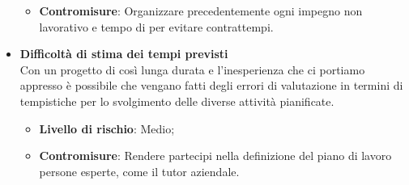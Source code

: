 \begin{itemize}
\begin{itemize}
	      	\item \textbf{Contromisure}: Organizzare precedentemente ogni impegno non lavorativo e tempo di  per evitare contrattempi.
	      \end{itemize}
	\item \textbf{Difficoltà di stima dei tempi previsti}\\
	      Con un progetto di così lunga durata e l'inesperienza che ci portiamo appresso è possibile che vengano fatti degli errori di valutazione in termini di tempistiche per lo svolgimento delle diverse attività pianificate.
	      \begin{itemize}
	      	\item \textbf{Livello di rischio}: Medio;
	      	\item \textbf{Contromisure}: Rendere partecipi nella definizione del piano di lavoro persone esperte, come il tutor aziendale.
	      \end{itemize}
\end{itemize}
